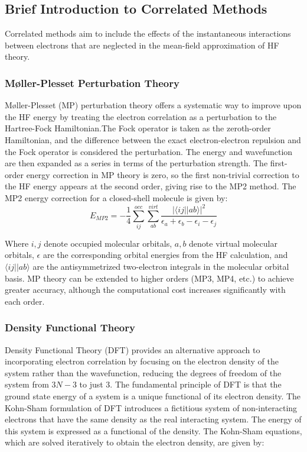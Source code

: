 \subsection{Brief Introduction to Correlated Methods}
\label{subsec:correlated_methods}
Correlated methods aim to include the effects of the instantaneous interactions between electrons that are neglected in the mean-field approximation of HF theory.
\subsubsection{Møller-Plesset Perturbation Theory}
Møller-Plesset (MP) perturbation theory offers a systematic way to improve upon the HF energy by treating the electron correlation as a perturbation to the Hartree-Fock Hamiltonian.The Fock operator is taken as the zeroth-order Hamiltonian, and the difference between the exact electron-electron repulsion and the Fock operator is considered the perturbation. The energy and wavefunction are then expanded as a series in terms of the perturbation strength. The first-order energy correction in MP theory is zero, so the first non-trivial correction to the HF energy appears at the second order, giving rise to the MP2 method. The MP2 energy correction for a closed-shell molecule is given by:
\begin{equation} \label{eq:MP2}
    E_{MP2} = - \frac{1}{4} \sum_{ij}^{occ} \sum_{ab}^{virt} \frac{|\langle i j || a b \rangle|^2}{\epsilon_a + \epsilon_b - \epsilon_i - \epsilon_j}
\end{equation}

Where $i,j$ denote occupied molecular orbitals, $a,b$ denote virtual molecular orbitals, $\epsilon$ are the corresponding orbital energies from the HF calculation, and $\langle ij||ab \rangle$ are the antisymmetrized two-electron integrals in the molecular orbital basis. MP theory can be extended to higher orders (MP3, MP4, etc.) to achieve greater accuracy, although the computational cost increases significantly with each order.
\subsubsection{Density Functional Theory}
Density Functional Theory (DFT) provides an alternative approach to incorporating electron correlation by focusing on the electron density of the system rather than the wavefunction, reducing the degrees of freedom of the system from $3N-3$ to just $3$. The fundamental principle of DFT is that the ground state energy of a system is a unique functional of its electron density. The Kohn-Sham formulation of DFT introduces a fictitious system of non-interacting electrons that have the same density as the real interacting system. The energy of this system is expressed as a functional of the density. The Kohn-Sham equations, which are solved iteratively to obtain the electron density, are given by:

